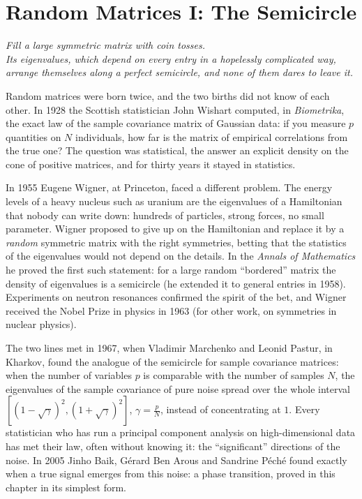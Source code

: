 \chapter{Random Matrices I: The Semicircle}\label{ch:semicircle}

\begin{center}\itshape
Fill a large symmetric matrix with coin tosses.\\
Its eigenvalues, which depend on every entry in a hopelessly complicated way,\\
arrange themselves along a perfect semicircle, and none of them dares to leave it.
\end{center}

Random matrices were born twice, and the two births did not know of each other. In 1928 the Scottish statistician John Wishart computed, in \emph{Biometrika}, the exact law of the sample covariance matrix of Gaussian data:
if you measure $p$ quantities on $N$ individuals, how far is the matrix of empirical correlations from the true one? The question was statistical, the answer an explicit density on the cone of positive matrices,
and for thirty years it stayed in statistics.

In 1955 Eugene Wigner, at Princeton, faced a different problem. The energy levels of a heavy nucleus such as uranium are the eigenvalues of a Hamiltonian that nobody can write down: hundreds of particles,
strong forces, no small parameter. Wigner proposed to give up on the Hamiltonian and replace it by a \emph{random} symmetric matrix with the right symmetries, betting that the statistics of the eigenvalues
would not depend on the details. In the \emph{Annals of Mathematics} he proved the first such statement: for a large random ``bordered'' matrix the density of eigenvalues is a semicircle (he extended it to general
entries in 1958). Experiments on neutron resonances confirmed the spirit of the bet, and Wigner received the Nobel Prize in physics in 1963 (for other work, on symmetries in nuclear physics).

The two lines met in 1967, when Vladimir Marchenko and Leonid Pastur, in Kharkov, found the analogue of the semicircle for sample covariance matrices: when the number of variables $p$ is comparable with the
number of samples $N$, the eigenvalues of the sample covariance of pure noise spread over the whole interval $[(1-\sqrt\gamma)^2,(1+\sqrt\gamma)^2]$, $\gamma=\frac pN$, instead of concentrating at $1$. Every statistician who has
run a principal component analysis on high-dimensional data has met their law, often without knowing it: the ``significant'' directions of the noise. In 2005 Jinho Baik, G\'erard Ben Arous and Sandrine P\'ech\'e found
exactly when a true signal emerges from this noise: a phase transition, proved in this chapter in its simplest form.

